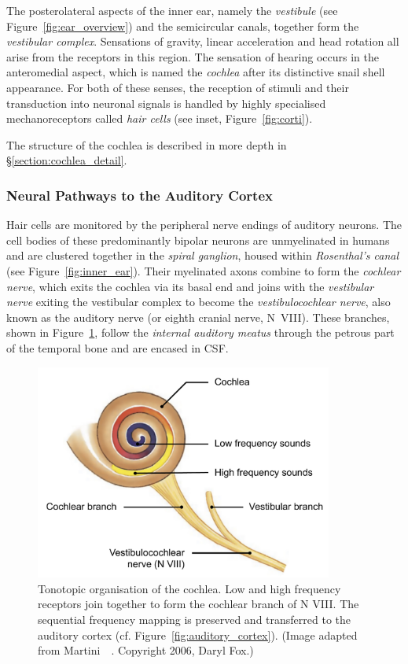 The posterolateral aspects of the inner ear, namely the \emph{vestibule} (see
Figure~\ref{fig:ear_overview}) and the semicircular canals, together form the
\emph{vestibular complex}. Sensations of gravity, linear acceleration and head
rotation all arise from the receptors in this region. The sensation of hearing
occurs in the anteromedial aspect, which is named the \emph{cochlea} after its
distinctive snail shell appearance. For both of these senses, the reception of
stimuli and their transduction into neuronal signals is handled by highly
specialised mechanoreceptors called \emph{hair cells} (see inset,
Figure~\ref{fig:corti}).

The structure of the cochlea is described in more depth in
\S\ref{section:cochlea_detail}.

\subsubsection{Neural Pathways to the Auditory Cortex}
\label{section:neural_pathways}

Hair cells are monitored by the peripheral nerve endings of auditory neurons.
The cell bodies of these predominantly bipolar neurons are unmyelinated in
humans~\cite{ota1980} and are clustered together in the \emph{spiral ganglion},
housed within \emph{Rosenthal's canal} (see Figure~\ref{fig:inner_ear}). Their
myelinated axons combine to form the \emph{cochlear nerve}, which exits the
cochlea via its basal end and joins with the \emph{vestibular nerve} exiting the
vestibular complex to become the \emph{vestibulocochlear nerve}, also known as
the auditory nerve (or eighth cranial nerve, N~VIII). These branches, shown in
Figure~\ref{fig:tonotopy}, follow the \emph{internal auditory meatus} through
the petrous part of the temporal bone and are encased in CSF.

\begin{figure}
	\centering
	\includegraphics[width=9.8cm]{Background/tonotopy}
	\caption[Tonotopic organisation of the cochlea]{Tonotopic organisation of the
	cochlea. Low and high frequency receptors join together to form the cochlear
	branch of N VIII. The sequential frequency mapping is preserved and
	transferred to the auditory cortex (cf. Figure~\ref{fig:auditory_cortex}).
	(Image adapted from Martini~\etal~\cite{martini2006}. Copyright
	\textcopyright{} 2006, Daryl Fox.)}
	\label{fig:tonotopy}
\end{figure}

